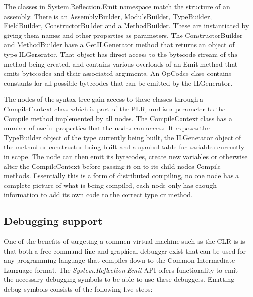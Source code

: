 	The classes in System.Reflection.Emit namespace match the structure of an 
	assembly. There is an \textsf{AssemblyBuilder}, \textsf{ModuleBuilder}, 
	\textsf{TypeBuilder}, \textsf{FieldBuilder}, \textsf{ConstructorBuilder} and 
	a \textsf{MethodBuilder}. These are instantiated by giving them names and 
	other properties as parameters. The \textsf{ConstructorBuilder} and 
	\textsf{MethodBuilder} have a \textsf{GetILGenerator} method that returns an 
	object of type \textsf{ILGenerator}. That object has direct access to the 
	bytecode stream of the method being created, and contains various overloads 
	of an \textsf{Emit} method that emits bytecodes and their associated 
	arguments. An \textsf{OpCodes} class contains constants for all possible 
	bytecodes that can be emitted by the \textsf{ILGenerator}.
	
	The nodes of the syntax tree gain access to these classes through a 
	\textsf{CompileContext} class which is part of the PLR, and is a parameter 
	to the \textsf{Compile} method implemented by all nodes. The 
	\textsf{CompileContext} class has a number of useful properties that the 
	nodes can access. It exposes the \textsf{TypeBuilder} object of the type 
	currently being built, the \textsf{ILGenerator} object of the method or 
	constructor being built and a symbol table for variables currently in scope. 
	The node can then emit its bytecodes, create new variables or otherwise 
	alter the \textsf{CompileContext} before passing it on to its child nodes 
	\textsf{Compile} methods. Essentially this is a form of distributed 
	compiling, no one node has a complete picture of what is being compiled, 
	each node only has enough information to add its own code to the correct 
	type or method.

\subsection{Debugging support}
	
	One of the benefits of targeting a common virtual machine such as the CLR is
	is that both a free command line and graphical debugger exist that can be 
	used for any programming language that compiles down to the Common 
	Intermediate Language format. The \textit{System.Reflection.Emit} API offers 
	functionality to emit the necessary debugging symbols to be able to use 
	these debuggers. Emitting debug symbols consists of the following five steps:
 	

